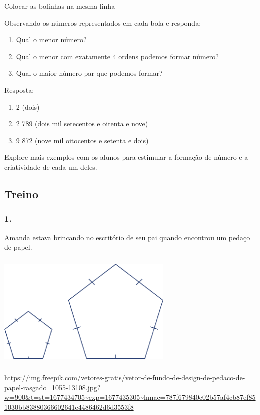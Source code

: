 Colocar as bolinhas na mesma linha

Observando os números representados em cada bola e responda:

\begin{enumerate}
\def\labelenumi{\alph{enumi})}
\item
  Qual o menor número?
\item
  Qual o menor com exatamente 4 ordens podemos formar número?
\item
  Qual o maior número par que podemos formar?
\end{enumerate}

Resposta:

\begin{enumerate}
\def\labelenumi{\alph{enumi})}
\item
  2 (dois)
\item
  2 789 (dois mil setecentos e oitenta e nove)
\item
  9 872 (nove mil oitocentos e setenta e dois)
\end{enumerate}

Explore mais exemplos com os alunos para estimular a formação de número
e a criatividade de cada um deles.

\subsection{Treino}\label{treino}

\subsubsection{1.}\label{section-10}

Amanda estava brincando no escritório de seu pai quando encontrou um
pedaço de papel.

\includegraphics[width=3.30833in,height=2.17391in]{media/image25.png}

\url{https://img.freepik.com/vetores-gratis/vetor-de-fundo-de-design-de-pedaco-de-papel-rasgado_1055-13108.jpg?w=900\&t=st=1677434705~exp=1677435305~hmac=787f679840c02b57af4cb87ef851030bb83880366602641e4486462d6d3553f8}

